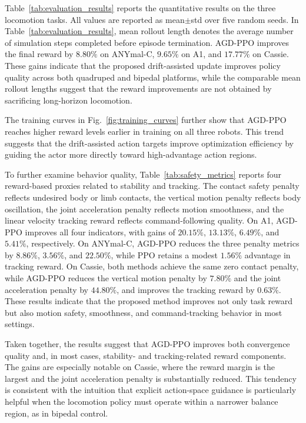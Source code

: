 \documentclass[conference]{IEEEtran}
\begin{document}
Table~\ref{tab:evaluation_results} reports the quantitative results on the three locomotion tasks. All values are reported as mean$\pm$std over five random seeds. In Table~\ref{tab:evaluation_results}, mean rollout length denotes the average number of simulation steps completed before episode termination. AGD-PPO improves the final reward by $8.80\%$ on ANYmal-C, $9.65\%$ on A1, and $17.77\%$ on Cassie. These gains indicate that the proposed drift-assisted update improves policy quality across both quadruped and bipedal platforms, while the comparable mean rollout lengths suggest that the reward improvements are not obtained by sacrificing long-horizon locomotion.

The training curves in Fig.~\ref{fig:training_curves} further show that AGD-PPO reaches higher reward levels earlier in training on all three robots. This trend suggests that the drift-assisted action targets improve optimization efficiency by guiding the actor more directly toward high-advantage action regions.

To further examine behavior quality, Table~\ref{tab:safety_metrics} reports four reward-based proxies related to stability and tracking. The contact safety penalty reflects undesired body or limb contacts, the vertical motion penalty reflects body oscillation, the joint acceleration penalty reflects motion smoothness, and the linear velocity tracking reward reflects command-following quality. On A1, AGD-PPO improves all four indicators, with gains of $20.15\%$, $13.13\%$, $6.49\%$, and $5.41\%$, respectively. On ANYmal-C, AGD-PPO reduces the three penalty metrics by $8.86\%$, $3.56\%$, and $22.50\%$, while PPO retains a modest $1.56\%$ advantage in tracking reward. On Cassie, both methods achieve the same zero contact penalty, while AGD-PPO reduces the vertical motion penalty by $7.80\%$ and the joint acceleration penalty by $44.80\%$, and improves the tracking reward by $0.63\%$. These results indicate that the proposed method improves not only task reward but also motion safety, smoothness, and command-tracking behavior in most settings.

Taken together, the results suggest that AGD-PPO improves both convergence quality and, in most cases, stability- and tracking-related reward components. The gains are especially notable on Cassie, where the reward margin is the largest and the joint acceleration penalty is substantially reduced. This tendency is consistent with the intuition that explicit action-space guidance is particularly helpful when the locomotion policy must operate within a narrower balance region, as in bipedal control.
\end{document}
